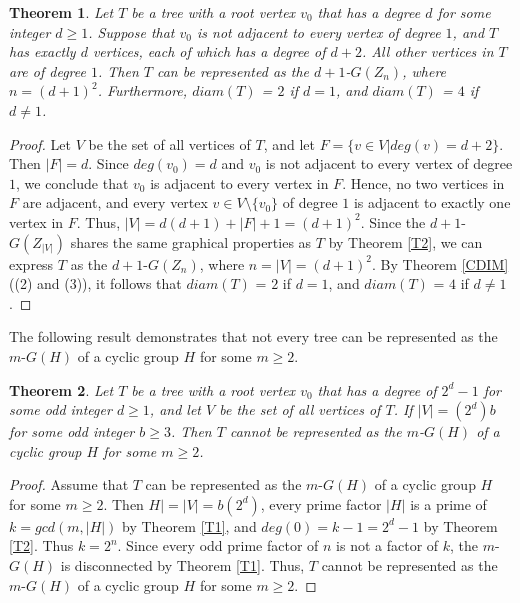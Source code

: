 \documentclass{amsart}
\newtheorem{thm}{Theorem}[section]
\theoremstyle{plain}
\begin{document}
\begin{thm}\label{Tree1}
Let $T$ be a tree with a root vertex $v_0$ that has a degree $d$ for some integer $d \geq 1$. Suppose that $v_0$ is not adjacent to every vertex of degree $1$, and $T$ has exactly $d$ vertices, each of which has a degree of $d + 2$.  All other vertices in $T$ are of degree $1$. Then $T$ can be represented as the $d+1$-$G(Z_n)$, where $n = (d+1)^2$. Furthermore, $diam(T)$ = $2$ if $d = 1$, and $diam(T)$ = $4$ if $d\not = 1$. 
\end{thm}
\begin{proof}
	Let $V$ be the set of all vertices of $T$, and let $F = \{v \in V | deg(v) = d+2\}$. Then $|F| = d$. Since $deg(v_0) = d$ and $v_0$ is not adjacent to every vertex of degree $1$, we conclude that $v_0$ is adjacent to every vertex in $F$. Hence, no two vertices in $F$ are adjacent, and every vertex $v \in V \setminus \{v_0\}$  of degree $1$ is adjacent to exactly one vertex in $F$. Thus, $|V| = d(d+1) + |F| + 1 = (d+1) ^2$. Since the $d+1$-$G(Z_{|V|})$ shares the same graphical properties as $T$ by Theorem \ref{T2}, we can express  $T$ as the $d+1$-$G(Z_n)$, where $n = |V| = (d + 1)^2$. By Theorem \ref{CDIM}((2) and (3)), it follows that $diam(T)$ = $2$ if $d = 1$, and $diam(T)$ = $4$ if $d\not = 1$. 
	
\end{proof}
The following result demonstrates that not every tree can be represented as the $m$-$G(H)$ of a cyclic group $H$ for some $m \geq 2$.
\begin{thm}\label{NoTree}
	Let $T$ be a tree with a root vertex $v_0$ that has a degree of $2^d - 1$ for some odd integer $d \geq 1$, and let $V$ be the set of all vertices of $T$. If $|V| = (2^d)b$ for some odd integer $b\geq 3$. Then $T$ cannot be represented as the $m$-$G(H)$ of a cyclic group $H$ for some $m \geq 2$.
\end{thm}
\begin{proof}
	Assume that $T$ can be represented as the $m$-$G(H)$ of a cyclic group $H$ for some $m \geq 2$. Then $H| = |V| = b(2^d)$, every prime factor $|H|$ is a prime of $k = gcd(m, |H|)$ by Theorem \ref{T1}, and $deg(0) = k - 1 = 2^d - 1$ by Theorem \ref{T2}. Thus $k = 2^n$. Since every odd prime factor of $n$ is not a factor of $k$, the $m$-$G(H)$ is disconnected by Theorem \ref{T1}. Thus, $T$ cannot be represented as the $m$-$G(H)$ of a cyclic group $H$ for some $m \geq 2$. 

\end{proof}
\end{document}
